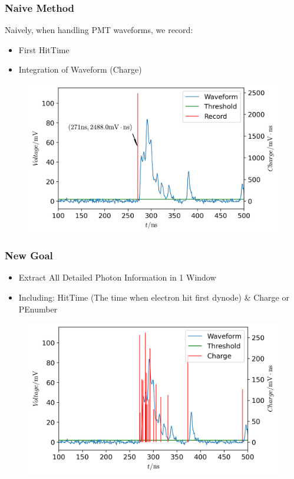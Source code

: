 \documentclass{beamer}
\begin{document}
\begin{frame}
\frametitle{Naive Method}
\hspace{4mm}Naively, when handling PMT waveforms, we record:
\begin{itemize}
    \item First HitTime
    \item Integration of Waveform (Charge)
\end{itemize}
\begin{figure}
    \centering
    \includegraphics[width=0.8\linewidth]{img/previous.png}
\end{figure}
\end{frame}

\begin{frame}
\frametitle{New Goal}
\begin{itemize}
    \item Extract All Detailed Photon Information in 1 Window
    \item Including: HitTime (The time when electron hit first dynode) \& Charge or PEnumber
\end{itemize}
\begin{figure}
    \centering
    \includegraphics[width=0.8\linewidth]{img/goal.png}
\end{figure}
\end{frame}
\end{document}
